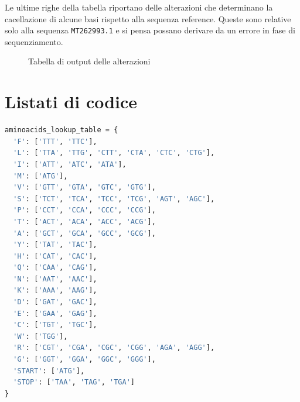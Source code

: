 \documentclass[11pt,italian]{article}
\begin{document}
Le ultime righe della tabella riportano delle alterazioni che determinano la cacellazione di alcune basi rispetto alla sequenza reference.
Queste sono relative solo alla sequenza \lstinline{MT262993.1} e si pensa possano derivare da un errore in fase di sequenziamento.

\begin{figure}
  \caption{Tabella di output delle alterazioni}
  \label{fig:alteration_table}
\end{figure}

\newpage
\section{Listati di codice}
\begin{lstlisting}[language=Python,caption=Tabella per la traduzione in amminoacidi,label=code:aminoacids_table]
aminoacids_lookup_table = {
  'F': ['TTT', 'TTC'],
  'L': ['TTA', 'TTG', 'CTT', 'CTA', 'CTC', 'CTG'],
  'I': ['ATT', 'ATC', 'ATA'],
  'M': ['ATG'],
  'V': ['GTT', 'GTA', 'GTC', 'GTG'],
  'S': ['TCT', 'TCA', 'TCC', 'TCG', 'AGT', 'AGC'],
  'P': ['CCT', 'CCA', 'CCC', 'CCG'],
  'T': ['ACT', 'ACA', 'ACC', 'ACG'],
  'A': ['GCT', 'GCA', 'GCC', 'GCG'],
  'Y': ['TAT', 'TAC'],
  'H': ['CAT', 'CAC'],
  'Q': ['CAA', 'CAG'],
  'N': ['AAT', 'AAC'],
  'K': ['AAA', 'AAG'],
  'D': ['GAT', 'GAC'],
  'E': ['GAA', 'GAG'],
  'C': ['TGT', 'TGC'],
  'W': ['TGG'],
  'R': ['CGT', 'CGA', 'CGC', 'CGG', 'AGA', 'AGG'],
  'G': ['GGT', 'GGA', 'GGC', 'GGG'],
  'START': ['ATG'],
  'STOP': ['TAA', 'TAG', 'TGA']
}
\end{lstlisting}
\end{document}
